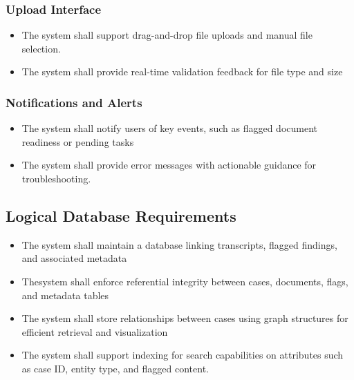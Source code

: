 \documentclass[12pt]{article}
\begin{document}
\subsubsection{Upload Interface}
\begin{itemize}
  \item  The system shall support drag-and-drop file uploads and manual file selection.
  \item  The system shall provide real-time validation feedback for file type and size
\end{itemize}


\subsubsection{ Notifications and Alerts}
\begin{itemize}
  \item   The system shall notify users of key events, such as flagged document readiness or pending
 tasks
  \item  The system shall provide error messages with actionable guidance for troubleshooting.
\end{itemize}

\subsection{Logical Database Requirements}
\begin{itemize}
  \item The system shall maintain a database linking transcripts, flagged findings, and associated metadata
  \item  Thesystem shall enforce referential integrity between cases, documents, flags, and metadata tables
\item The system shall store relationships between cases using graph structures for efficient retrieval and visualization
\item  The system shall support indexing for search capabilities on attributes such as case ID, entity type, and flagged content.
\end{itemize}
\end{document}
